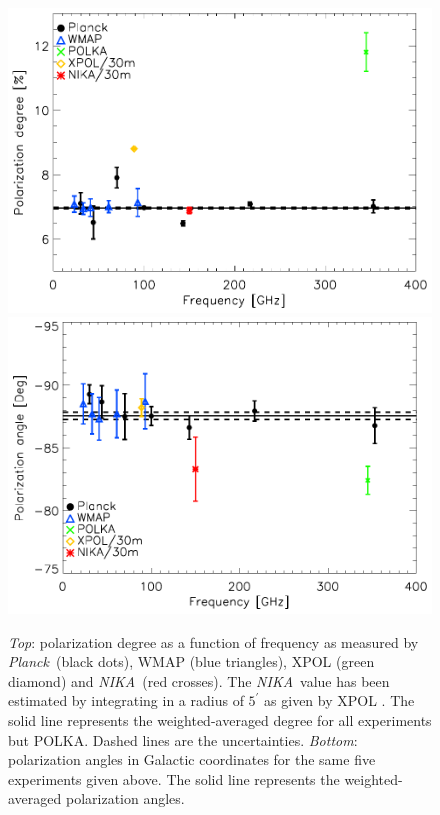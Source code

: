 \documentclass[twocolumn,traditabstract]{aa}
\def\NIKA{\textit{NIKA}}
\def\Planck{\textit{Planck}}
\begin{document}
\begin{figure}
  \centering
          { \includegraphics[width=1\linewidth,keepaspectratio]{figures/pdegree_comparison.pdf}}
          { \includegraphics[width=1\linewidth,keepaspectratio]{figures/angle_comparison.pdf}} 
            \caption{{\it Top}: polarization degree as a function of frequency as measured by \Planck\ (black dots), WMAP (blue triangles), XPOL (green diamond) and \NIKA\ (red crosses). The \NIKA\ value has been estimated by integrating in a radius of $5^{\prime}$ as given by XPOL \citep{aumont2010}. The solid line represents the weighted-averaged degree for all experiments but POLKA.
            Dashed lines are the uncertainties.
            {\it Bottom}: polarization angles in Galactic coordinates for the same five experiments given above. The solid line represents the weighted-averaged polarization angles.} %
\label{crab_p_angle_comparison}		
  \end{figure}
\end{document}
